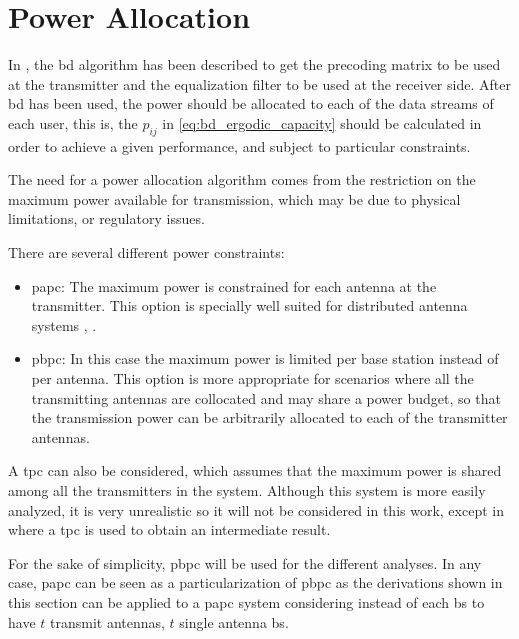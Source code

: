 \section{Power Allocation}\label{sec:power_allocation}

In , the \gls{bd} algorithm has been described to get the precoding
matrix to be used at the transmitter and the equalization filter to be used at
the receiver side. After \gls{bd} has been used, the power should be allocated
to each of the data streams of each user, this is, the $p_{ij}$ in
\eqref{eq:bd_ergodic_capacity} should be calculated in order to achieve a given
performance, and subject to particular constraints.

The need for a power allocation algorithm comes from the restriction on the
maximum power available for transmission, which may be due to physical
limitations, or regulatory issues.

There are several different power constraints:

\begin{itemize}
    \item \gls{papc}: The maximum power is constrained for each antenna at the
        transmitter. This option is specially well suited for distributed
        antenna systems \cite{choi07}, \cite{lee12}.
    \item \gls{pbpc}: In this case the maximum power is limited per base station
        instead of per antenna. This option is more appropriate for scenarios
        where all the transmitting antennas are collocated and may share a power
        budget, so that the transmission power can be arbitrarily allocated to
        each of the transmitter antennas.
\end{itemize}

A \gls{tpc} can also be considered, which assumes that the maximum power is
shared among all the transmitters in the system. Although this system is more
easily analyzed, it is very unrealistic so it will not be considered in this
work, except in  where a \gls{tpc} is used to obtain an
intermediate result.

For the sake of simplicity, \gls{pbpc} will be used for the different analyses. In any case, \gls{papc} can be seen as a particularization of \gls{pbpc} as the
derivations shown in this section can be applied to a \gls{papc} system
considering instead of each \gls{bs} to have $t$ transmit antennas, $t$ single
antenna \gls{bs}.

